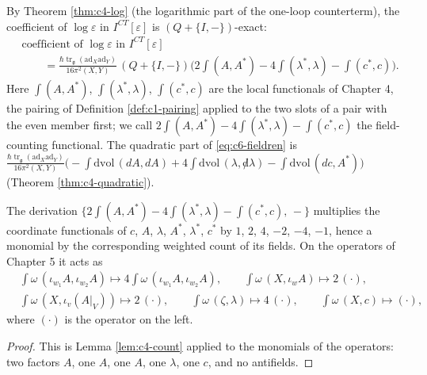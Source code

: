 By Theorem \ref{thm:c4-log} (the logarithmic part of the one-loop counterterm), the coefficient of $\log\varepsilon$ in $I^{CT}[\varepsilon]$ is $(Q+\{I,-\})$-exact:
\begin{equation}
\begin{aligned}
&\text{coefficient of }\log\varepsilon\text{ in }I^{CT}[\varepsilon]\\
&\qquad=\frac{\hbar\operatorname{tr}_{\mathfrak g}(\mathrm{ad}_X\mathrm{ad}_Y)}{16\pi^2(X,Y)}\,(Q+\{I,-\})\Big(2\int(A,A^*)-4\int(\lambda^*,\lambda)-\int(c^*,c)\Big).
\end{aligned}
\label{eq:c6-fieldren}
\end{equation}
Here $\int(A,A^*)$, $\int(\lambda^*,\lambda)$, $\int(c^*,c)$ are the local functionals of Chapter 4, the pairing of Definition \ref{def:c1-pairing} applied to the two slots of a pair with the even member first; we call $2\int(A,A^*)-4\int(\lambda^*,\lambda)-\int(c^*,c)$ the field-counting functional. The quadratic part of \eqref{eq:c6-fieldren} is $\frac{\hbar\operatorname{tr}_{\mathfrak g}(\mathrm{ad}_X\mathrm{ad}_Y)}{16\pi^2(X,Y)}\big(-\int\mathrm{dvol}\,(dA,dA)+4\int\mathrm{dvol}\,(\lambda,{\not d}\lambda)-\int\mathrm{dvol}\,(dc,A^*)\big)$ (Theorem \ref{thm:c4-quadratic}).

\begin{lemma}
\label{lem:c6-count}
The derivation $\big\{2\int(A,A^*)-4\int(\lambda^*,\lambda)-\int(c^*,c),\,-\big\}$ multiplies the coordinate functionals of $c$, $A$, $\lambda$, $A^*$, $\lambda^*$, $c^*$ by $1$, $2$, $4$, $-2$, $-4$, $-1$, hence a monomial by the corresponding weighted count of its fields. On the operators of Chapter 5 it acts as
\[
\begin{aligned}
&\int\omega\,(\iota_{w_1}A,\iota_{w_2}A)\mapsto4\int\omega\,(\iota_{w_1}A,\iota_{w_2}A),\qquad \int\omega\,(X,\iota_wA)\mapsto2\,(\cdot),\\
&\int\omega\,(X,\iota_v(A|_V))\mapsto2\,(\cdot),\qquad \int\omega\,(\zeta,\lambda)\mapsto4\,(\cdot),\qquad \int\omega\,(X,c)\mapsto(\cdot),
\end{aligned}
\]
where $(\cdot)$ is the operator on the left.
\end{lemma}

\begin{proof}
This is Lemma \ref{lem:c4-count} applied to the monomials of the operators: two factors $A$, one $A$, one $A$, one $\lambda$, one $c$, and no antifields.
\end{proof}

